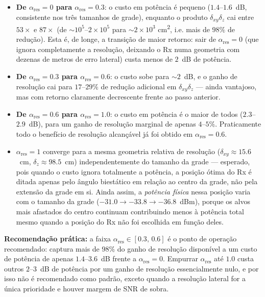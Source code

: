 \documentclass[11pt, a4paper]{article}
\newcommand{\dxy}{\delta_{xy}}
\newcommand{\dz}{\delta_z}
\newcommand{\alphares}{\alpha_{\mathrm{res}}}
\begin{document}
\begin{itemize}
  \item \textbf{De $\alphares=0$ para $\alphares=0.3$}: o custo em potência é
        pequeno ($1.4$--$1.6$~dB, consistente nos três tamanhos de grade),
        enquanto o produto $\dxy\dz$ cai entre $53\times$ e $87\times$
        (de $\sim\!10^5$--$2\times10^5$ para $\sim\!2\times10^3$
        cm\textsuperscript{2}, i.e. mais de $98\%$ de redução). Esta é, de
        longe, a transição de maior retorno: sair de $\alphares=0$ (que ignora
        completamente a resolução, deixando o Rx numa geometria com dezenas de
        metros de erro lateral) custa menos de $2$~dB de potência.
  \item \textbf{De $\alphares=0.3$ para $\alphares=0.6$}: o custo sobe para
        $\sim\!2$~dB, e o ganho de resolução cai para $17$--$29\%$ de redução
        adicional em $\dxy\dz$ — ainda vantajoso, mas com retorno claramente
        decrescente frente ao passo anterior.
  \item \textbf{De $\alphares=0.6$ para $\alphares=1.0$}: o custo em potência
        é o maior de todos ($2.3$--$2.9$~dB), para um ganho de resolução
        marginal de apenas $4$--$5\%$. Praticamente todo o benefício de
        resolução alcançável já foi obtido em $\alphares=0.6$.
  \item $\alphares=1$ converge para a mesma geometria relativa de resolução
        ($\dxy\approx15.6$~cm, $\dz\approx98.5$~cm) independentemente do
        tamanho da grade — esperado, pois quando o custo ignora totalmente a
        potência, a posição ótima do Rx é ditada apenas pelo ângulo biestático
        em relação ao centro da grade, não pela extensão da grade em si.
        Ainda assim, a \emph{potência física} nessa posição varia com o
        tamanho da grade ($-31.0 \to -33.8 \to -36.8$~dBm), porque os alvos
        mais afastados do centro continuam contribuindo menos à potência
        total mesmo quando a posição do Rx não foi escolhida em função deles.
\end{itemize}

\textbf{Recomendação prática:} a faixa $\alphares \in [0.3,\,0.6]$ é o ponto de
operação recomendado: captura mais de $98\%$ do ganho de resolução disponível
a um custo de potência de apenas $1.4$--$3.6$~dB frente a $\alphares=0$.
Empurrar $\alphares$ até $1.0$ custa outros $2$--$3$~dB de potência por um
ganho de resolução essencialmente nulo, e por isso não é recomendado como
padrão, exceto quando a resolução lateral for a única prioridade e houver
margem de SNR de sobra.
\end{document}
